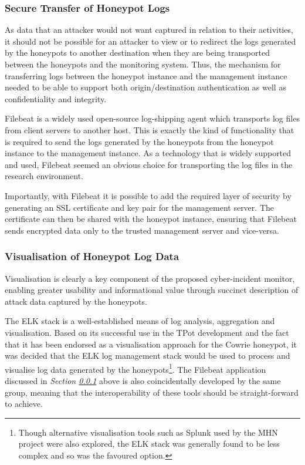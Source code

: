 \subsubsection{Secure Transfer of Honeypot Logs} \label{SecureLogTransfer}
As data that an attacker would not want captured in relation to their activities, it should not be possible for an attacker to view or to redirect the logs generated by the honeypots to another destination when they are being transported between the honeypots and the monitoring system. Thus, the mechanism for transferring logs between the honeypot instance and the management instance needed to be able to support both origin/destination authentication as well as confidentiality and integrity.


Filebeat is a widely used open-source log-shipping agent which transports log files from client servers to another host. This is exactly the kind of functionality that is required to send the logs generated by the honeypots from the honeypot instance to the management instance. As a technology that is widely supported and used, Filebeat seemed an obvious choice for transporting the log files in the research environment. 

Importantly, with Filebeat it is possible to add the required layer of security by generating an SSL certificate and key pair for the management server. The certificate can then be shared with the honeypot instance, ensuring that Filebeat sends encrypted data only to the trusted management server and vice-versa. \cite{FilebeatSSLProtection}

\subsubsection{Visualisation of Honeypot Log Data} \label{VisualisationDesignChoice}
Visualisation is clearly a key component of the proposed cyber-incident monitor, enabling greater usability and informational value through succinct description of attack data captured by the honeypots. 

The ELK stack is a well-established means of log analysis, aggregation and visualisation. Based on its successful use in the TPot development \cite{TPotWebpagev17} and the fact that it has been endorsed as a visualisation approach for the Cowrie honeypot, \cite{CowrieWebsite} it was decided that the ELK log management stack would be used to process and visualise log data generated by the honeypots\footnote{Though alternative visualisation tools such as Splunk used by the MHN project were also explored, \cite{ModernHoneyNetworkLaunchAnnouncement} the ELK stack was generally found to be less complex and so was the favoured option.}. The Filebeat application discussed in \textit{Section \ref{SecureLogTransfer}} above is also coincidentally developed by the same group, meaning that the interoperability of these tools should be straight-forward to achieve.



